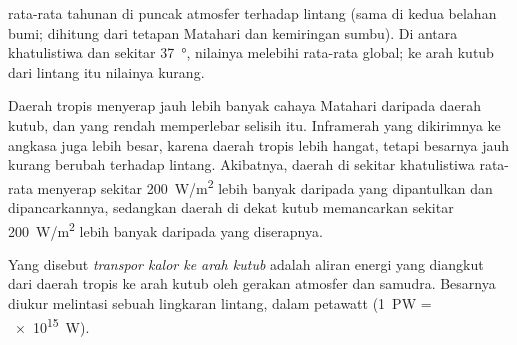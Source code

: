 \begin{omfigure}

{\small {} rata-rata tahunan di puncak atmosfer terhadap lintang (sama di
kedua belahan bumi; dihitung dari tetapan Matahari dan kemiringan sumbu). Di
antara khatulistiwa dan sekitar \qty{37}{\degree}, nilainya melebihi rata-rata
global; ke arah kutub dari lintang itu nilainya kurang.}
\end{omfigure}

Daerah tropis menyerap jauh lebih banyak cahaya Matahari daripada daerah
kutub, dan  yang rendah memperlebar selisih itu. Inframerah yang
dikirimnya ke angkasa juga lebih besar, karena daerah tropis lebih hangat,
tetapi besarnya jauh kurang berubah terhadap lintang. Akibatnya, daerah di
sekitar khatulistiwa rata-rata menyerap sekitar \qty{200}{W/m^2} lebih banyak
daripada yang dipantulkan dan dipancarkannya, sedangkan daerah di dekat kutub
memancarkan sekitar \qty{200}{W/m^2} lebih banyak daripada yang diserapnya.

\begin{definition}\label{def:g10:earth-energy-budget:heat-transport}
Yang disebut
\emph{transpor kalor ke arah kutub} adalah aliran energi yang diangkut dari daerah tropis ke arah kutub oleh
gerakan atmosfer dan samudra. Besarnya diukur melintasi sebuah lingkaran
lintang, dalam petawatt (\qty{1}{PW} = \qty{e15}{W}).
\end{definition}

